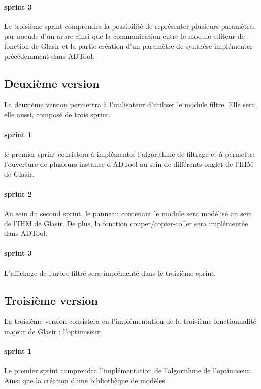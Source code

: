 		\paragraph{sprint 3} Le troisième sprint comprendra la possibilité de représenter plusieurs paramètres par noeuds d'un arbre ainsi que la communication entre le module editeur de fonction de Glasir et la partie création d'un paramètre de synthése implémenter précédemment dans ADTool. 


	\subsection{ Deuxième version }

		La deuxième version permettra à l'utilisateur d'utiliser le module filtre. Elle sera, elle aussi, composé de trois sprint. 

		\paragraph{sprint 1}  le premier sprint consistera à implémenter l'algorithme de filtrage et à permettre l'ouverture de plusieurs instance d'ADTool au sein de différents onglet de l'IHM de Glasir. 

		\paragraph{sprint 2} Au sein du second sprint, le panneau contenant le module sera modélisé au sein de l'IHM de Glasir. De plus, la fonction couper/copier-coller sera implémentée dans ADTool. %

		\paragraph{sprint 3} L'affichage de l'arbre filtré sera implémenté dans le troisième sprint. 


	\subsection{ Troisième version }

		La troisième version consistera en l'implémentation de la troisième fonctionnalité majeur de Glasir : l'optimiseur. 

		\paragraph{sprint 1} Le premier sprint comprendra l'implémentation de l'algorithme de l'optimiseur. Ainsi que la création d'une bibliothèque de modèles. 

